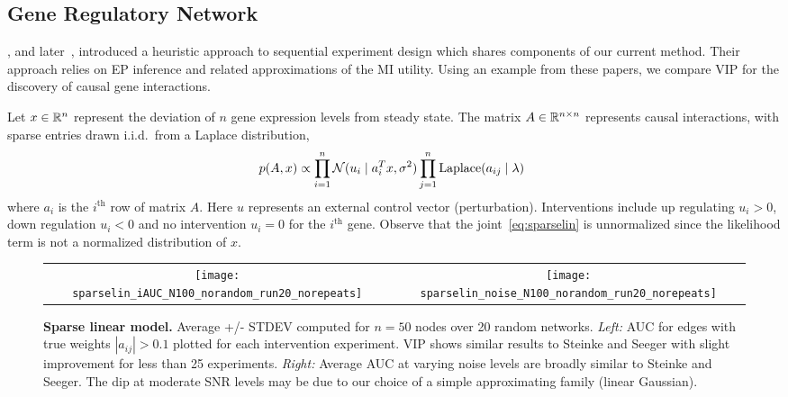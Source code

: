 \subsection{Gene Regulatory Network}

\cite{steinke2007experimental}, and later~\cite{seeger2008bayesian},
introduced a heuristic approach to sequential experiment design which
shares components of our current method.  Their approach relies on EP
inference and related approximations of the MI utility.  Using an
example from these papers, we compare VIP for the discovery of causal
gene interactions.

Let $x\in\mathbb{R}^n$ represent the deviation of $n$ gene expression levels
from steady state.  The matrix $A\in\mathbb{R}^{n\times n}$ represents causal
interactions, with sparse entries drawn i.i.d.~from a Laplace
distribution,
\begin{equation}\label{eq:sparselin}
  \!\!\!p(A,x) \propto \prod_{i=1}^n \mathcal{N}(u_i \mid a_i^T
    x, \sigma^2) \prod_{j=1}^n \textrm{Laplace}(a_{ij} \mid \lambda) 
\end{equation}
where $a_i$ is the $i^{\text{th}}$ row of matrix $A$.  Here $u$
represents an external control vector (perturbation).  Interventions
include up regulating $u_i>0$, down regulation $u_i<0$ and no
intervention $u_i=0$ for the $i^{\text{th}}$ gene.  Observe that the
joint~\eqref{eq:sparselin} is unnormalized since the likelihood term
is not a normalized distribution of $x$.

\begin{figure}[t]
  \centering
  \begin{tabular}{cc}
    \hspace{-3mm}\texttt{[image: sparselin\_iAUC\_N100\_norandom\_run20\_norepeats]} &
    \hspace{-3mm}\texttt{[image: sparselin\_noise\_N100\_norandom\_run20\_norepeats]}
  \end{tabular}
  \caption{\small\textbf{Sparse linear model.} Average +/- STDEV
    computed for $n=50$ nodes over 20 random networks.  \emph{Left:}
    AUC for edges with true weights $|a_{ij}|>0.1$ plotted for each
    intervention experiment.  VIP shows similar results to Steinke and
    Seeger with slight improvement for less than 25 experiments.
    \emph{Right:} Average AUC at varying noise levels are broadly
    similar to Steinke and Seeger. The dip at moderate SNR levels may
    be due to our choice of a simple approximating family (linear
    Gaussian).}
  
  \label{fig:sparselin}
\end{figure}

